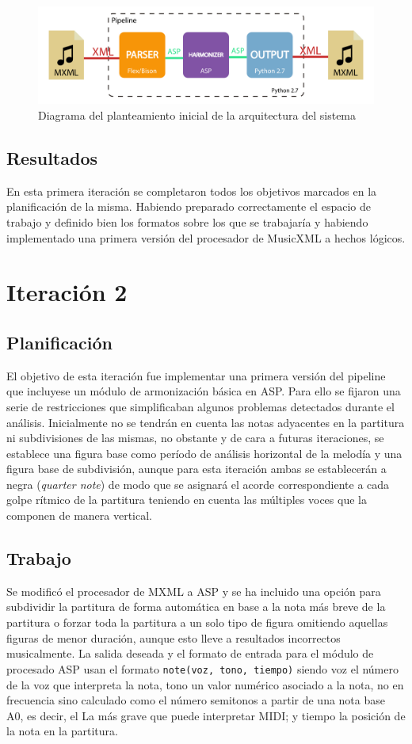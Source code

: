 \begin{figure}
	\centering
	\includegraphics[width=0.8\linewidth]{imagenes/arquitectura_inicial.pdf}
	\caption{Diagrama del planteamiento inicial de la arquitectura del sistema}
	\label{fig:arquitectura_inicial}
\end{figure}

\subsection{Resultados}
En esta primera iteración se completaron todos los objetivos marcados en la planificación de la misma. Habiendo preparado correctamente el espacio de trabajo y definido bien los formatos sobre los que se trabajaría y habiendo implementado una primera versión del procesador de MusicXML a hechos lógicos.

\section{Iteración 2}
\subsection{Planificación}
El objetivo de esta iteración fue implementar una primera versión del pipeline que incluyese un módulo de armonización básica en ASP. Para ello se fijaron una serie de restricciones que simplificaban algunos problemas detectados durante el análisis. Inicialmente no se tendrán en cuenta las notas adyacentes en la partitura ni subdivisiones de las mismas, no obstante y de cara a futuras iteraciones, se establece una figura base como período de análisis horizontal de la melodía y una figura base de subdivisión, aunque para esta iteración ambas se establecerán a negra (\textit{quarter note}) de modo que se asignará el acorde correspondiente a cada golpe rítmico de la partitura teniendo en cuenta las múltiples voces que la componen de manera vertical.

\subsection{Trabajo}
Se modificó el procesador de MXML a ASP y se ha incluido una opción para subdividir la partitura de forma automática en base a la nota más breve de la partitura o forzar toda la partitura a un solo tipo de figura omitiendo aquellas figuras de menor duración, aunque esto lleve a resultados incorrectos musicalmente. La salida deseada y el formato de entrada para el módulo de procesado ASP usan el formato \texttt{note(voz, tono, tiempo)} siendo voz el número de la voz que interpreta la nota, tono un valor numérico asociado a la nota, no en frecuencia sino calculado como el número semitonos a partir de una nota base A0, es decir, el La más grave que puede interpretar MIDI; y tiempo la posición de la nota en la partitura.

